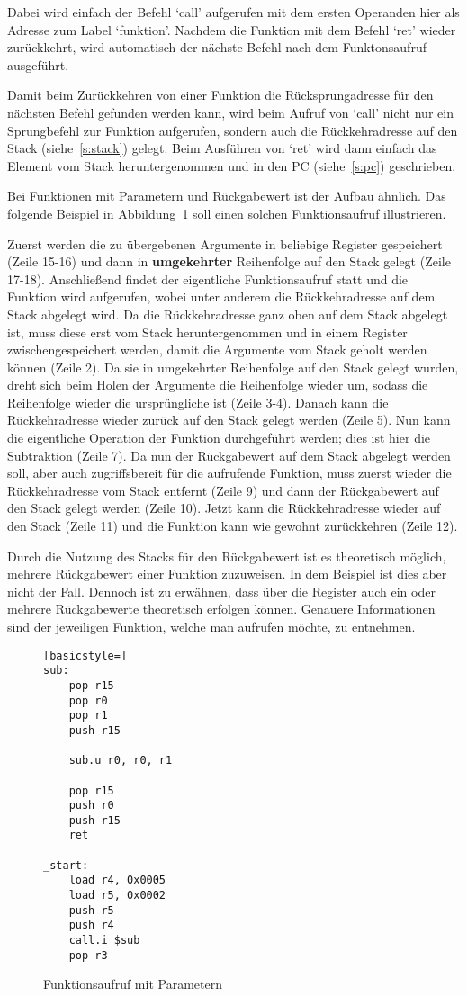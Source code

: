 Dabei wird einfach der Befehl `call' aufgerufen mit dem ersten Operanden hier
als Adresse zum Label `funktion'. Nachdem die Funktion mit dem Befehl `ret'
wieder zurückkehrt, wird automatisch der nächste Befehl nach dem Funktonsaufruf
ausgeführt.

Damit beim Zurückkehren von einer Funktion die Rücksprungadresse für den
nächsten Befehl gefunden werden kann, wird beim Aufruf von `call' nicht nur ein
Sprungbefehl zur Funktion aufgerufen, sondern auch die Rückkehradresse auf den
Stack (siehe~\ref{s:stack}) gelegt. Beim Ausführen von `ret' wird dann einfach
das Element vom Stack heruntergenommen und in den PC (siehe~\ref{s:pc})
geschrieben.

Bei Funktionen mit Parametern und Rückgabewert ist der Aufbau ähnlich. Das
folgende Beispiel in Abbildung~\ref{code:function_parameter} soll einen solchen
Funktionsaufruf illustrieren.

Zuerst werden die zu übergebenen Argumente in beliebige Register gespeichert
(Zeile 15-16) und dann in \textbf{umgekehrter} Reihenfolge auf den Stack gelegt
(Zeile 17-18). Anschließend findet der eigentliche Funktionsaufruf statt und die
Funktion wird aufgerufen, wobei unter anderem die Rückkehradresse auf dem Stack
abgelegt wird. Da die Rückkehradresse ganz oben auf dem Stack abgelegt ist, muss
diese erst vom Stack heruntergenommen und in einem Register zwischengespeichert
werden, damit die Argumente vom Stack geholt werden können (Zeile 2). Da sie in
umgekehrter Reihenfolge auf den Stack gelegt wurden, dreht sich beim Holen der
Argumente die Reihenfolge wieder um, sodass die Reihenfolge wieder die
ursprüngliche ist (Zeile 3-4). Danach kann die Rückkehradresse wieder zurück auf
den Stack gelegt werden (Zeile 5). Nun kann die eigentliche Operation der
Funktion durchgeführt werden; dies ist hier die Subtraktion (Zeile 7). Da nun
der Rückgabewert auf dem Stack abgelegt werden soll, aber auch zugriffsbereit
für die aufrufende Funktion, muss zuerst wieder die Rückkehradresse vom Stack
entfernt (Zeile 9) und dann der Rückgabewert auf den Stack gelegt werden (Zeile
10). Jetzt kann die Rückkehradresse wieder auf den Stack (Zeile 11) und die
Funktion kann wie gewohnt zurückkehren (Zeile 12).

Durch die Nutzung des Stacks für den Rückgabewert ist es theoretisch möglich,
mehrere Rückgabewert einer Funktion zuzuweisen. In dem Beispiel ist dies aber
nicht der Fall. Dennoch ist zu erwähnen, dass über die Register auch ein oder
mehrere Rückgabewerte theoretisch erfolgen können. Genauere Informationen sind
der jeweiligen Funktion, welche man aufrufen möchte, zu entnehmen.
\begin{figure}[!htb]
\begin{lstlisting}[basicstyle=]
sub:
	pop r15
	pop r0
	pop r1
	push r15

	sub.u r0, r0, r1

	pop r15
	push r0
	push r15
	ret

_start:
	load r4, 0x0005
	load r5, 0x0002
	push r5
	push r4
	call.i $sub
	pop r3
\end{lstlisting}
\caption{Funktionsaufruf mit Parametern}
\label{code:function_parameter}
\end{figure}

